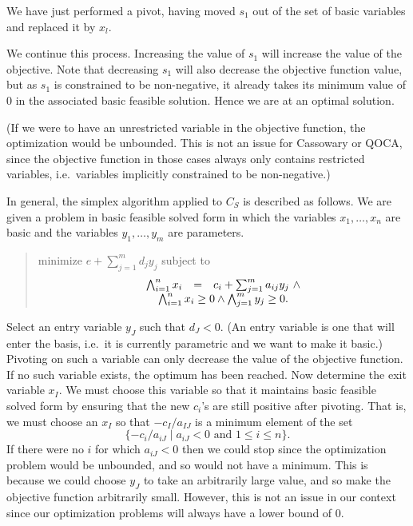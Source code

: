 \documentclass{article}
\begin{document}
We have just performed a pivot, having moved $s_1$ out of the set of basic
variables and replaced it by $x_l$.

We continue this process.  Increasing the value of $s_1$ will increase the
value of the objective.  Note that decreasing $s_1$ will also decrease the
objective function value, but as $s_1$ is constrained to be non-negative,
it already takes its minimum value of $0$ in the associated basic feasible
solution.  Hence we are at an optimal solution.  

(If we were to have an unrestricted variable in the objective function, the
optimization would be unbounded.  This is not an issue for Cassowary or
QOCA, since the objective function in those cases always only contains
restricted variables, i.e.\ variables implicitly constrained to be
non-negative.)

In general, the simplex algorithm applied to $C_S$ 
is described as follows. 
We are given a problem in basic feasible solved form in which 
the variables $x_1, \ldots ,x_n$ are basic and the variables
$y_1, \ldots ,y_m$ are parameters.
\begin{quote}\vspace*{-1ex}
minimize $e + \sum_{j=1}^{m} d_j y_j$
subject to 
$$
\begin{array}{rcr}
        \bigwedge_{i=1}^{n} x_i & = & c_i + \sum_{j=1}^{m} a_{ij} y_j ~\wedge\\
                  \multicolumn{3}{c}{\bigwedge_{i=1}^{n} x_i \ge 0 \wedge
		  \bigwedge_{j=1}^{m} y_j \ge 0. }
            \end{array}
$$
\end{quote}\vspace{-0.9ex}
Select an entry variable $y_J$ such that $d_J < 0$.  (An entry variable is
one that will enter the basis, i.e.\ it is currently parametric and we want
to make it basic.)
Pivoting on such a variable can only decrease the value of the objective
function.
If no such variable exists, the optimum has been reached.
Now determine the exit variable $x_I$\@.  We must choose this variable so that
it maintains  basic feasible solved form by ensuring 
that the new $c_i$'s are still positive after pivoting. 
That is, we must choose an $x_I$ 
so that $- c_I/ a_{IJ}$ is a minimum element
of the set
$$
\{ -c_i/a_{iJ} \mid a_{iJ} < 0 \mbox{ and } 1 \le i \le n \}.
$$
If there were no $i$ for which $a_{iJ} < 0$ then we could stop since the
optimization problem would be unbounded, and so would not have
a minimum.  This is because we could choose $y_J$ to take an arbitrarily
large value, and so make the objective function arbitrarily small.
However, this is not an issue in our context since our
optimization problems will always have a lower bound of 0.
\end{document}
